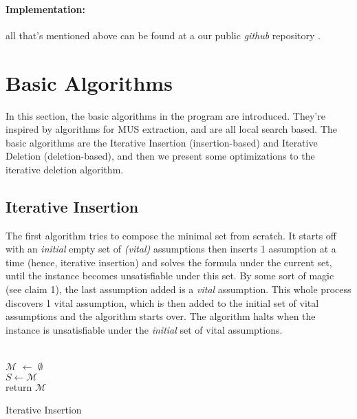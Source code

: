 \documentclass[]{article}
\begin{document}
	\paragraph{Implementation:} all that's mentioned above can be found at a our public \textit{github} repository \cite{MCArep}.
	
	\pagebreak
	\section{Basic Algorithms}
	In this section, the basic algorithms in the program are introduced. They're inspired by algorithms for MUS extraction\cite{PracticalAlgs}, and are all local search based. The basic algorithms are the Iterative Insertion (insertion-based) and Iterative Deletion (deletion-based), and then we present some optimizations to the iterative deletion algorithm.
	\subsection{Iterative Insertion}
		The first algorithm tries to compose the minimal set from scratch. It starts off with an \textit{initial} empty set of \textit{(vital)} assumptions then inserts 1 assumption at a time (hence, iterative insertion) and solves the formula under the current set, until the instance becomes unsatisfiable under this set. By some sort of magic (see claim 1), the last assumption added is a \textit{vital} assumption. This whole process discovers 1 vital assumption, which is then added to the initial set of vital assumptions and the algorithm starts over. The algorithm halts when the instance is unsatisfiable under the \textit{initial} set of vital assumptions.\\\\
		\begin{algorithm}[H]
		$ \mathcal{M} $ $\leftarrow$ $\emptyset$\\
		 {
			$  S  \leftarrow  \mathcal{M} $\\
		}
		return $ \mathcal{M} $
		\caption{Iterative Insertion}
	\end{algorithm}
	
\end{document}
